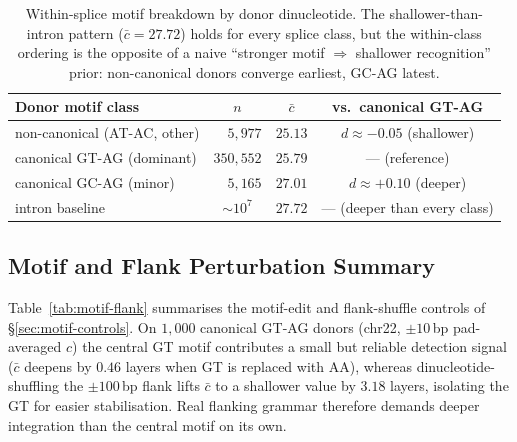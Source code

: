 \documentclass{article}
\theoremstyle{plain}
\theoremstyle{definition}
\theoremstyle{remark}
\begin{document}
\begin{table}[!htbp]
  \caption{Within-splice motif breakdown by donor dinucleotide. The
    shallower-than-intron pattern ($\bar c\!=\!27.72$) holds for every
    splice class, but the within-class ordering is the opposite of a naive
    ``stronger motif $\Rightarrow$ shallower recognition'' prior:
  non-canonical donors converge earliest, GC-AG latest.}
  \label{tab:splice-canonical}
  \centering
  \small
  \begin{tabular}{@{}lccc@{}}
    \toprule
    Donor motif class & $n$ & $\bar c$ & vs.\ canonical GT-AG \\
    \midrule
    non-canonical (AT-AC, other) & $\phantom{00}5{,}977$ & $25.13$ & $d\approx -0.05$ (shallower) \\
    canonical GT-AG (dominant)   & $350{,}552$ & $25.79$ & --- (reference) \\
    canonical GC-AG (minor)      & $\phantom{00}5{,}165$ & $27.01$ & $d\approx +0.10$ (deeper) \\
    \midrule
    intron baseline              & $\sim\!10^7$           & $27.72$ & --- (deeper than every class) \\
    \bottomrule
  \end{tabular}
\end{table}

\subsection{Motif and Flank Perturbation Summary}
\label{app:motif-flank}

Table~\ref{tab:motif-flank} summarises the motif-edit and flank-shuffle
controls of \S\ref{sec:motif-controls}. On $1{,}000$ canonical GT-AG
donors (chr22, $\pm 10$\,bp pad-averaged $c$) the central GT motif
contributes a small but reliable detection signal ($\bar c$ deepens by
$0.46$ layers when GT is replaced with AA), whereas dinucleotide-shuffling
the $\pm 100$\,bp flank lifts $\bar c$ to a shallower value by $3.18$ layers, isolating the
GT for easier stabilisation. Real flanking grammar therefore demands
deeper integration than the central motif on its own.
\end{document}
